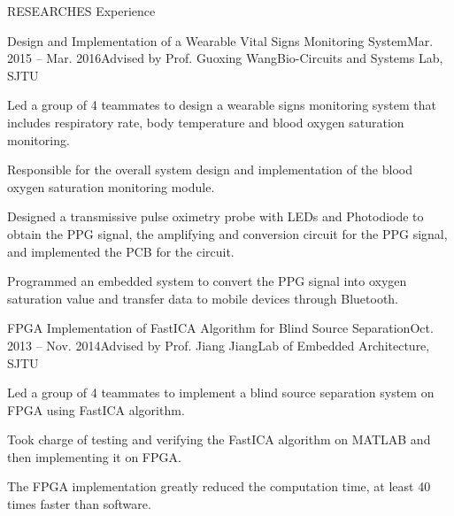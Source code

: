 \documentclass{resume_Stanford} %
\begin{document}
\begin{rSection}{RESEARCHES Experience}
\begin{rSubsection}{Design and Implementation of a Wearable Vital Signs Monitoring System}{Mar. 2015 -- Mar. 2016}{Advised by Prof. Guoxing Wang}{Bio-Circuits and Systems Lab, SJTU}
\item Led a group of 4 teammates to design a wearable signs monitoring system that includes respiratory rate, body temperature and blood oxygen saturation monitoring. 
\item Responsible for the overall system design and implementation of the blood oxygen saturation monitoring module.
\item Designed a transmissive pulse oximetry probe with LEDs and Photodiode to obtain the PPG signal, the amplifying and conversion circuit for the PPG signal, and implemented the PCB for the circuit. 
\item Programmed an embedded system to convert the PPG signal into oxygen saturation value and transfer data to mobile devices through Bluetooth.
\end{rSubsection}

\begin{rSubsection}{FPGA Implementation of FastICA Algorithm for Blind Source Separation}{Oct. 2013 -- Nov. 2014}{Advised by Prof. Jiang Jiang}{Lab of Embedded Architecture, SJTU}
\item Led a group of 4 teammates to implement a blind source separation system on FPGA using FastICA algorithm.
\item Took charge of testing and verifying the FastICA algorithm on MATLAB and then implementing it on FPGA. 
\item The FPGA implementation greatly reduced the computation time, at least 40 times faster than software.
\end{rSubsection}

\end{rSection}
\end{document}
